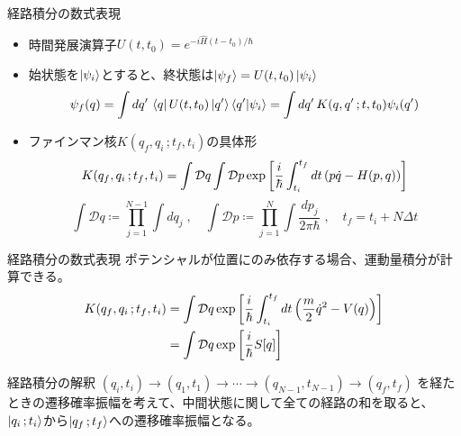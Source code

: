 \documentclass[14pt,aspectratio=169,xcolor=dvipsnames,table,dvipdfmx]{beamer}
\theoremstyle{definition}
\begin{document}
\begin{frame}{経路積分の数式表現}
  \begin{itemize}
    \item 時間発展演算子$U(t,t_0)=e^{-i\hat{H}(t-t_0)/\hbar}$
    \item 始状態を$\ket{\psi_i}$とすると、終状態は$\ket{\psi_f}=U(t,t_0)\ket{\psi_i}$
          \begin{equation*}
            \psi_f(q) = \int dq'\,\bra{q}U(t,t_0)\ket{q'}\bra{q'}\ket{\psi_i}
            = \int dq'\,K(q,q'\,;t,t_0)\psi_i(q')
          \end{equation*}
    \item ファインマン核$K(q_f,q_i\,;t_f,t_i)$の具体形
          \begin{equation*}
            K(q_f,q_i\,;t_f,t_i) = \int\mathcal{D}q\int\mathcal{D}p
            \exp\qty[\frac{i}{\hbar}\int_{t_i}^{t_f}dt\,(p\dot{q}-H(p,q))]
          \end{equation*}
          \begin{equation*}
            \int \mathcal{D}q \coloneqq \prod_{j=1}^{N-1} \int dq_j\;,\quad
            \int \mathcal{D}p \coloneqq \prod_{j=1}^N \int \frac{dp_j}{2\pi\hbar}\;,\quad
            t_f = t_i + N\varDelta t
          \end{equation*}
  \end{itemize}
\end{frame}
\begin{frame}{経路積分の数式表現}
  ポテンシャルが位置にのみ依存する場合、運動量積分が計算できる。
  \begin{align*}
    K(q_f,q_i\,;t_f,t_i) & = \int\mathcal{D}q
    \exp\qty[\frac{i}{\hbar}\int_{t_i}^{t_f}dt\,\qty(\frac{m}{2}\dot{q}^2 - V(q))] \\
                         & = \int\mathcal{D}q\exp\qty[\frac{i}{\hbar}S[q]]
  \end{align*}
  \begin{block}{経路積分の解釈}
    $(q_i,t_i)\to(q_1,t_1)\to\cdots\to(q_{N-1},t_{N-1})\to(q_f,t_f)$
    を経たときの遷移確率振幅を考えて、中間状態に関して全ての経路の和を取ると、\\
    $\ket{q_i\,;t_i}$から$\ket{q_f\,;t_f}$への遷移確率振幅となる。
  \end{block}
\end{frame}
\end{document}
